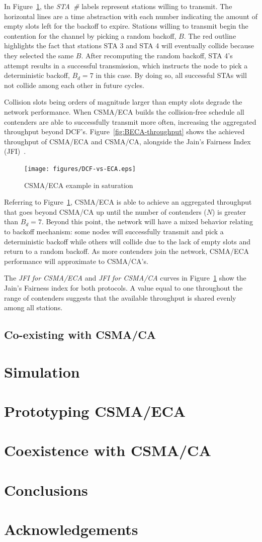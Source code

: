 \documentclass[a4paper,journal]{IEEEtran}
\begin{document}
In Figure~\ref{fig:BECA}, the \emph{STA~\#} labels represent stations willing to transmit. The horizontal lines are a time abstraction with each number indicating the amount of empty slots left for the backoff to expire. Stations willing to transmit begin the contention for the channel by picking a random backoff, $B$. The red outline highlights the fact that stations STA 3 and STA 4 will eventually collide because they selected the same $B$. After recomputing the random backoff, STA 4's attempt results in a successful transmission, which instructs the node to pick a deterministic backoff, $B_{d}=7$ in this case. By doing so, all successful STAs will not collide among each other in future cycles.

Collision slots being orders of magnitude larger than empty slots degrade the network performance. When CSMA/ECA builds the collision-free schedule all contenders are able to successfully transmit more often, increasing the aggregated throughput beyond DCF's. Figure~\ref{fig:BECA-throughput} shows the achieved throughput of CSMA/ECA and CSMA/CA, alongside the Jain's Fairness Index (JFI)~\cite{JFI}.

\begin{figure}[htbp]
\centering
  \texttt{[image: figures/DCF-vs-ECA.eps]}
  \caption{CSMA/ECA example in saturation}
  \label{fig:BECA}
\end{figure}

Referring to Figure~\ref{fig:BECA}, CSMA/ECA is able to achieve an aggregated throughput that goes beyond CSMA/CA up until the number of contenders ($N$) is greater than $B_{d}=7$. Beyond this point, the network will have a mixed behavior relating to backoff mechanism: some nodes will successfully transmit and pick a deterministic backoff while others will collide due to the lack of empty slots and return to a random backoff. As more contenders join the network, CSMA/ECA performance will approximate to CSMA/CA's.

The \emph{JFI for CSMA/ECA} and \emph{JFI for CSMA/CA} curves in Figure~\ref{fig:BECA} show the Jain's Fairness index for both protocols. A value equal to one throughout the range of contenders suggests that the available throughput is shared evenly among all stations.

	\subsection{Co-existing with CSMA/CA}
\section{Simulation}\label{simulations}
\section{Prototyping CSMA/ECA}\label{prototype}
\section{Coexistence with CSMA/CA}\label{prototypeResults}
\section{Conclusions}\label{conclusions}
\section{Acknowledgements}




\end{document}
